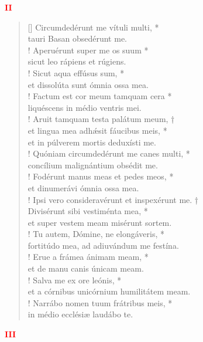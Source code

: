 \begin{center}
\textcolor{red}{\bf II}\\
\end{center}
\begin{verse}[\versewidth]
Circumdedérunt me vítuli multi, *\\
tauri Basan obsedérunt me.\\!
\vin Aperuérunt super me os suum *\\
\vin sicut leo rápiens et rúgiens.\\!
Sicut aqua effúsus sum, *\\
et dissolúta sunt ómnia ossa mea.\\!
\vin Factum est cor meum tamquam cera *\\
\vin liquéscens in médio ventris mei.\\!
Aruit tamquam testa palátum meum, †\\
et lingua mea adh\'{æ}sit fáucibus meis, *\\
et in púlverem mortis deduxísti me.\\!
\vin Quóniam circumdedérunt me canes multi, *\\
\vin concílium malignántium obsédit me.\\!
Fodérunt manus meas et pedes meos, *\\
et dinumerávi ómnia ossa mea.\\!
\vin Ipsi vero consideravérunt et inspexérunt me. †\\
\vin Divisérunt sibi vestiménta mea, *\\
\vin et super vestem meam misérunt sortem.\\!
Tu autem, Dómine, ne elongáveris, *\\
fortitúdo mea, ad adiuvándum me festína.\\!
\vin Erue a frámea ánimam meam, *\\
\vin et de manu canis únicam meam.\\!
Salva me ex ore leónis, *\\
et a córnibus unicórnium humilitátem meam.\\!
\vin Narrábo nomen tuum frátribus meis, *\\
\vin in médio ecclésiæ laudábo te.\\
\end{verse}
\begin{center}
\textcolor{red}{\bf III}\\
\end{center}
